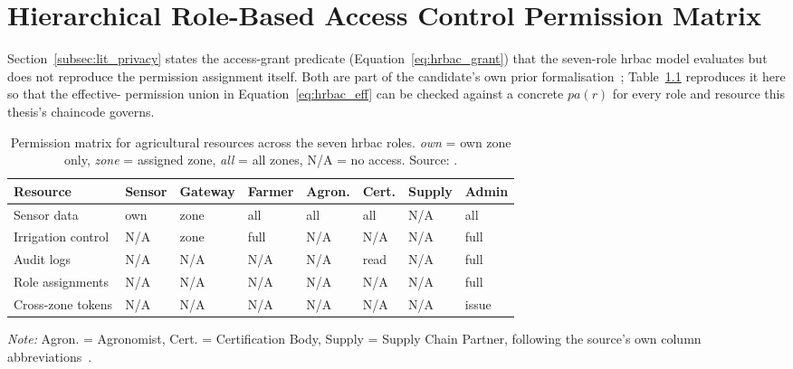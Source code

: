 \documentclass[12pt,a4paper,oneside]{book}
\begin{document}
\chapter{Hierarchical Role-Based Access Control Permission Matrix}
\label{app:hrbac_matrix}

Section~\ref{subsec:lit_privacy} states the access-grant predicate
(Equation~\ref{eq:hrbac_grant}) that the seven-role \gls{hrbac} model
evaluates but does not reproduce the permission assignment itself. Both are
part of the candidate's own prior formalisation~\cite{beloasone2025hrbac};
Table~\ref{tab:app-hrbac-matrix} reproduces it here so that the effective-
permission union in Equation~\ref{eq:hrbac_eff} can be checked against a
concrete $pa(r)$ for every role and resource this thesis's chaincode
governs.

\begin{table}[htbp]
\centering
\caption{Permission matrix for agricultural resources across the seven
         \gls{hrbac} roles. \emph{own} = own zone only, \emph{zone} =
         assigned zone, \emph{all} = all zones, N/A = no access.
         Source: \cite{beloasone2025hrbac}.}
\label{tab:app-hrbac-matrix}
\footnotesize
\begin{tabularx}{\textwidth}{@{}p{}X X X X X X X@{}}
\toprule
\textbf{Resource} & \textbf{Sensor} & \textbf{Gateway} & \textbf{Farmer} &
  \textbf{Agron.} & \textbf{Cert.} & \textbf{Supply} & \textbf{Admin} \\
\midrule
Sensor data        & own & zone & all  & all & all  & N/A   & all \\
Irrigation control  & N/A & zone & full & N/A & N/A  & N/A   & full \\
Audit logs          & N/A & N/A  & N/A  & N/A & read & N/A   & full \\
Role assignments    & N/A & N/A  & N/A  & N/A & N/A  & N/A   & full \\
Cross-zone tokens   & N/A & N/A  & N/A  & N/A & N/A  & N/A   & issue \\
\bottomrule
\end{tabularx}
{\footnotesize \textit{Note:} Agron. = Agronomist, Cert. = Certification
 Body, Supply = Supply Chain Partner, following the source's own column
 abbreviations~\cite{beloasone2025hrbac}.}
\end{table}
\end{document}
